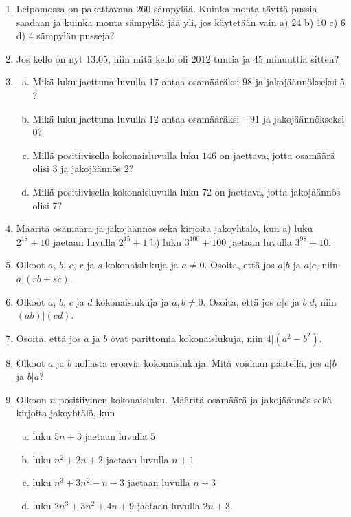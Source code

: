 \begin{enumerate}
\item Leipomossa on pakattavana $260$ sämpylää. Kuinka monta täyttä pussia saadaan ja kuinka monta sämpylää jää yli, jos käytetään vain a) $24$ b) $10$ c) $6$ d) $4$ sämpylän pusseja?

\item 
Jos kello on nyt 13.05, niin mitä kello oli 2012 tuntia ja 45 minuuttia sitten?

\item 
\begin{enumerate}[a)]
\item Mikä luku jaettuna luvulla $17$ antaa osamääräksi $98$ ja jakojäännökseksi $5$?
\item Mikä luku jaettuna luvulla $12$ antaa osamääräksi $-91$ ja jakojäännökseksi $0$?
\item Millä positiivisella kokonaisluvulla luku $146$ on jaettava, jotta osamäärä olisi $3$ ja jakojäännös $2$?
\item Millä positiivisella kokonaisluvulla luku $72$ on jaettava, jotta jakojäännös olisi 7?
\end{enumerate}

\item Määritä osamäärä ja jakojäännös sekä kirjoita jakoyhtälö, kun a) luku $2^{18} + 10$ jaetaan luvulla $2^{15} + 1$ b) luku $3^{100} + 100$ jaetaan luvulla $3^{98} + 10$.

\item Olkoot $a$, $b$, $c$, $r$ ja $s$ kokonaislukuja ja $a \neq 0$. Osoita, että jos $a|b$ ja $a|c$, niin $a|(rb + sc)$.

\item Olkoot $a$, $b$, $c$ ja $d$ kokonaislukuja ja $a, b \neq 0$. Osoita, että jos $a|c$ ja $b|d$, niin $(ab)|(cd)$.

\item Osoita, että jos $a$ ja $b$ ovat parittomia kokonaislukuja, niin $4 | (a^2 - b^2)$.

\item Olkoot $a$ ja $b$ nollasta eroavia kokonaislukuja. Mitä voidaan päätellä, jos $a|b$ ja $b|a$?

\item Olkoon $n$ positiivinen kokonaisluku. Määritä osamäärä ja jakojäännös sekä kirjoita jakoyhtälö, kun
\begin{enumerate}[a)]
\item luku $5n + 3$ jaetaan luvulla $5$
\item luku $n^2 + 2n + 2$ jaetaan luvulla $n + 1$
\item luku $n^3 + 3n^2 - n - 3$ jaetaan luvulla $n + 3$
\item luku $2n^3 + 3n^2 + 4n + 9$ jaetaan luvulla $2n + 3$.
\end{enumerate}


\end{enumerate}
